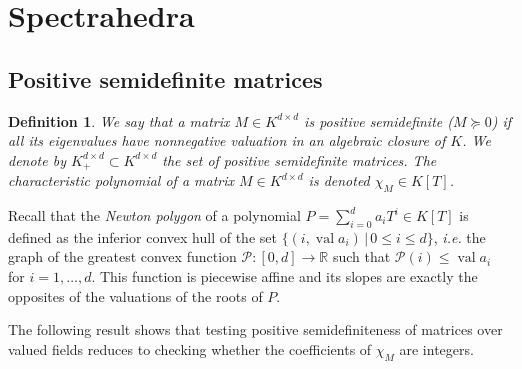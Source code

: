 \documentclass[a4paper,oneside,10pt]{article}
\newtheorem{definition}[theorem]{Definition}
\newcommand{\R}{\mathbb{R}} %
\DeclareMathOperator{\val}{val}
\begin{document}
\section{Spectrahedra}

\subsection{Positive semidefinite matrices}
\newcommand\Mat{Positive semidefinite matrix }
\newcommand\mats{positive semidefinite matrices }
\newcommand\Mats{positive semidefinite matrices }

\begin{definition}
  We say that a matrix $M \in K^{d \times d}$ is \emph{positive semidefinite} ($M \succeq 0$)
  if all its eigenvalues have nonnegative valuation in an algebraic closure of $K$.
  We denote by $K^{d \times d}_+ \subset K^{d\times d}$ the set of positive semidefinite matrices.
  The characteristic polynomial of a matrix $M \in K^{d\times d}$ is denoted $\chi_M \in K[T]$.
\end{definition}

Recall that the \emph{Newton polygon} of a polynomial $P = \sum_{i=0}^{d} a_i T^i \in K[T]$ is
defined as the inferior convex hull of the set $\{(i, \val a_i) \,|\, 0 \le i \le d\}$, {\it i.e.} the
graph of the greatest convex function $\mathcal{P} : [0,d] \to \R$ such that $\mathcal{P}(i) \leq \val a_i$
for $i=1,\ldots,d$. This function is piecewise affine and its slopes are exactly the opposites of the valuations
of the roots of $P$.

The following result shows that testing positive semidefiniteness of matrices over
valued fields reduces to checking whether the coefficients of $\chi_M$ are integers.
\end{document}
